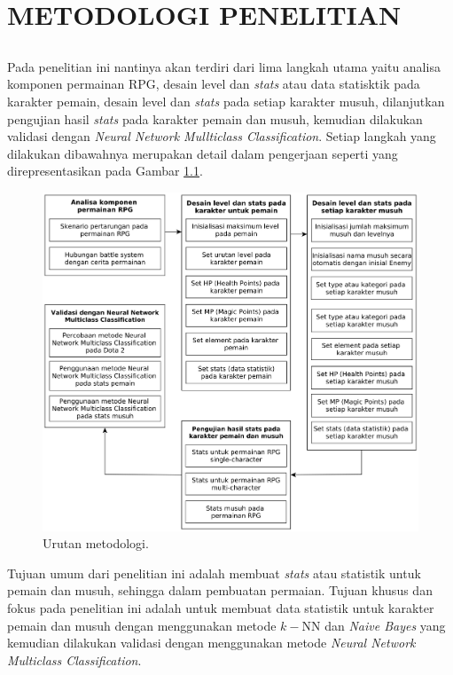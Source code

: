 \chapter{METODOLOGI PENELITIAN}
\label{chap:chap3_metodologi}

\section*{}
Pada penelitian ini nantinya akan terdiri dari lima langkah utama yaitu analisa komponen permainan RPG, desain level dan \textit{stats} atau data statisktik pada karakter pemain, desain level dan \textit{stats} pada setiap karakter musuh, dilanjutkan pengujian hasil \textit{stats} pada karakter pemain dan musuh, kemudian dilakukan validasi dengan \textit{Neural Network Mullticlass Classification}. Setiap langkah yang dilakukan dibawahnya merupakan detail dalam pengerjaan seperti yang direpresentasikan pada Gambar \ref{fig:metodologi}.
\vspace{1ex}

\begin{figure} [!h] \centering
	\includegraphics[scale=0.12]{img/metodologi_4.png}
	\caption{Urutan metodologi.}
	\label{fig:metodologi}
\end{figure}
\vspace{1ex}

Tujuan umum dari penelitian ini adalah membuat \textit{stats} atau statistik untuk pemain dan musuh, sehingga dalam pembuatan permaian. Tujuan khusus dan fokus pada penelitian ini adalah untuk membuat data statistik untuk karakter pemain dan musuh dengan menggunakan metode $k-$NN dan \textit{Naive Bayes} yang kemudian dilakukan validasi dengan menggunakan metode \textit{Neural Network} \textit{Multiclass Classification}.
\vspace{1ex}

